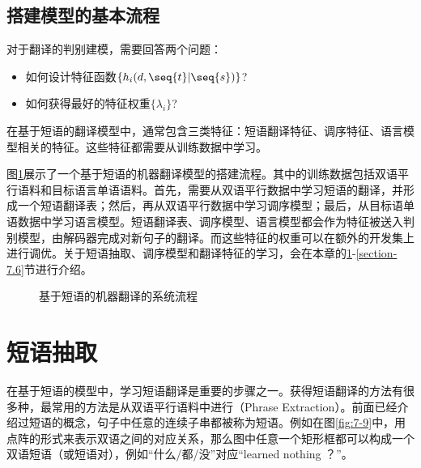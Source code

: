 \subsection{搭建模型的基本流程}

\parinterval 对于翻译的判别建模，需要回答两个问题：

\begin{itemize}
\vspace{0.5em}
\item 如何设计特征函数$\{h_i(d,\seq{t}|\seq{s})\}$?
\vspace{0.5em}
\item 如何获得最好的特征权重$\{\lambda_i\}$?
\vspace{0.5em}
\end{itemize}

在基于短语的翻译模型中，通常包含三类特征：短语翻译特征、调序特征、语言模型相关的特征。这些特征都需要从训练数据中学习。

\parinterval 图\ref{fig:7-8}展示了一个基于短语的机器翻译模型的搭建流程。其中的训练数据包括双语平行语料和目标语言单语语料。首先，需要从双语平行数据中学习短语的翻译，并形成一个短语翻译表；然后，再从双语平行数据中学习调序模型；最后，从目标语单语数据中学习语言模型。短语翻译表、调序模型、语言模型都会作为特征被送入判别模型，由解码器完成对新句子的翻译。而这些特征的权重可以在额外的开发集上进行调优。关于短语抽取、调序模型和翻译特征的学习，会在本章的\ref{section-7.3}-\ref{section-7.6}节进行介绍。

\begin{figure}[htp]
\centering

\caption{基于短语的机器翻译的系统流程}
\label{fig:7-8}
\end{figure}


\sectionnewpage
\section{短语抽取}\label{section-7.3}

\parinterval 在基于短语的模型中，学习短语翻译是重要的步骤之一。获得短语翻译的方法有很多种，最常用的方法是从双语平行语料中进行{\small{}}（Phrase Extraction）。前面已经介绍过短语的概念，句子中任意的连续子串都被称为短语。例如在图\ref{fig:7-9}中，用点阵的形式来表示双语之间的对应关系，那么图中任意一个矩形框都可以构成一个双语短语（或短语对），例如“什么/都/没”对应“learned nothing ？”。

